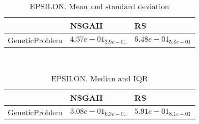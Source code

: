 \documentclass{article}
\begin{document}
\
\begin{table}
\caption{EPSILON. Mean and standard deviation}
\label{table:mean.EPSILON}
\centering
\begin{scriptsize}
\begin{tabular}{lll}
\hline & NSGAII &  RS\\
\hline
GeneticProblem & \cellcolor{gray95}$  4.37e-01_{ 3.9e-01}$ & $  6.48e-01_{ 5.8e-01}$ \\
\hline
\end{tabular}
\end{scriptsize}
\end{table}
\
\begin{table}
\caption{EPSILON. Median and IQR}
\label{table:median.EPSILON}
\begin{scriptsize}
\centering
\begin{tabular}{lll}
\hline & NSGAII &  RS\\
\hline
GeneticProblem & \cellcolor{gray95}$  3.08e-01_{ 6.3e-01}$ & $  5.91e-01_{ 8.1e-01}$ \\
\hline
\end{tabular}
\end{scriptsize}
\end{table}
\end{document}
